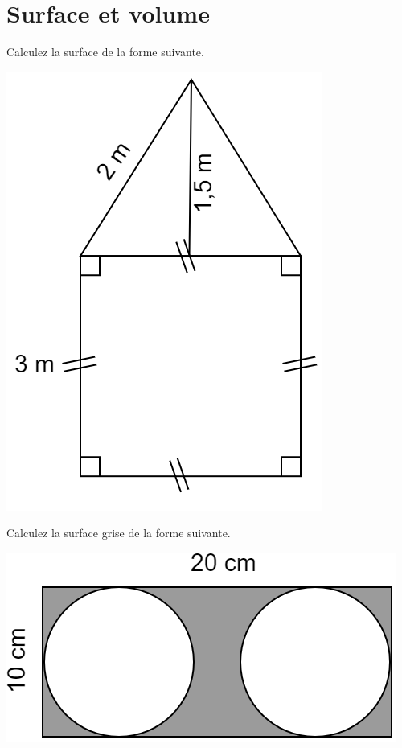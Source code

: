 \documentclass[12pt,a4paper]{article} %
\begin{document}
\section{Surface et volume}
\begin{exo} Calculez la surface de la forme suivante.\end{exo}
\begin{center}
\includegraphics[scale=0.6]{M1.png}
\end{center}


\begin{exo} Calculez la surface grise de la forme suivante.\end{exo}
\begin{center}
\includegraphics[scale=0.6]{R1.png}
\end{center}
\end{document}
